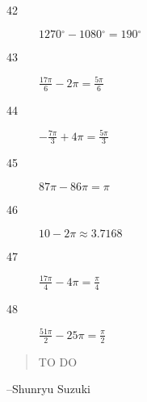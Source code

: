 \documentclass{exam}
\newcommand{\degree}{\ensuremath{^\circ}}
\begin{document}
\begin{description}
      \item[42] $1270 \degree - 1080 \degree = \boxed{ 190 \degree }$

      \item[43] $\frac{17 \pi}{6} - 2 \pi = \frac{5 \pi}{6}$

      \item[44] $- \frac{7 \pi}{3} + 4 \pi = \frac{5 \pi}{3}$

      \item[45] $87 \pi - 86 \pi = \pi$

      \item[46] $10 - 2 \pi \approx 3.7168$

      \item[47] $\frac{17 \pi}{4} - 4 \pi = \frac{\pi}{4}$

      \item[48] $\frac{51 \pi}{2} - 25 \pi = \frac{\pi}{2}$

    \end{description}

  \else
    \vspace{1 cm}
    \begin{quote}
      \begin{em}
        TO DO
      \end{em}
    \end{quote}
    \hspace{1 cm} --Shunryu Suzuki
  \fi
\end{document}
